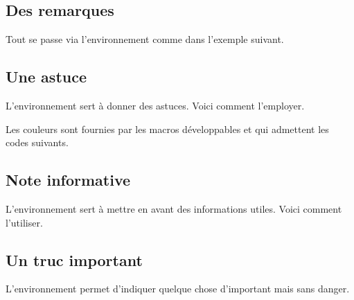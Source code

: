 \subsection{Des remarques}

Tout se passe via l'environnement  comme dans l'exemple suivant.




\subsection{Une astuce}

L'environnement  sert à donner des astuces. Voici comment l'employer.




\smallskip

\begin{tdocnote}
    Les couleurs sont fournies par les macros développables  et  qui admettent les codes suivants.

    \begin{tdoclatex}[code]
    \end{tdoclatex}
\end{tdocnote}


\subsection{Note informative}

L'environnement  sert à mettre en avant des informations utiles. Voici comment l'utiliser.




\subsection{Un truc important}

L'environnement  permet d'indiquer quelque chose d'important mais sans danger.





